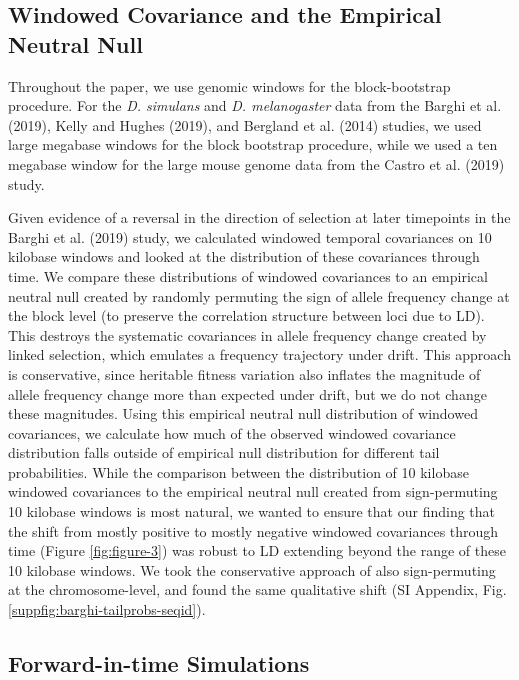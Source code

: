 \documentclass[9pt,twocolumn,twoside]{pnas-new}
\begin{document}
{\subsection*{Windowed Covariance and the Empirical Neutral Null}

Throughout the paper, we use genomic windows for the block-bootstrap procedure.
For the \emph{D. simulans} and \emph{D.  melanogaster} data from the
Barghi et al. (2019), Kelly and Hughes (2019), and
Bergland et al. (2014) studies, we used large megabase windows for the
block bootstrap procedure, while we used a ten megabase window for the large
mouse genome data from the Castro et al. (2019) study. 

Given evidence of a reversal in the direction of selection at later timepoints
in the Barghi et al. (2019) study, we calculated windowed temporal covariances
on 10 kilobase windows and looked at the distribution of these covariances
through time. We compare these distributions of windowed covariances to an
empirical neutral null created by randomly permuting the sign of allele
frequency change at the block level (to preserve the correlation structure
between loci due to LD). This destroys the systematic covariances in allele
frequency change created by linked selection, which emulates a frequency
trajectory under drift. This approach is conservative, since heritable fitness
variation also inflates the magnitude of allele frequency change more than
expected under drift, but we do not change these magnitudes. Using this
empirical neutral null distribution of windowed covariances, we calculate how
much of the observed windowed covariance distribution falls outside of
empirical null distribution for different tail probabilities. While the
comparison between the distribution of 10 kilobase windowed covariances to the
empirical neutral null created from sign-permuting 10 kilobase windows is most
natural, we wanted to ensure that our finding that the shift from mostly
positive to mostly negative windowed covariances through time (Figure
\ref{fig:figure-3}) was robust to LD extending beyond the range of these 10
kilobase windows. We took the conservative approach of also sign-permuting at
the chromosome-level, and found the same qualitative shift (SI Appendix, Fig.
\ref{suppfig:barghi-tailprobs-seqid}).

\subsection*{Forward-in-time Simulations}

}
\end{document}
